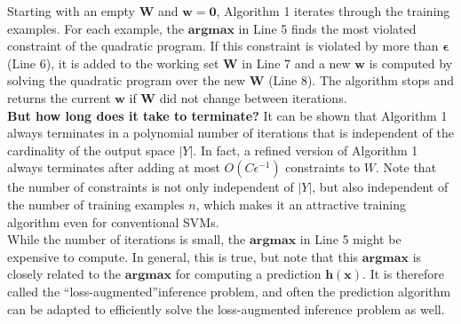 \documentclass[twoside]{article}
\begin{document}
Starting
with an empty $\mathbf{W}$ and $\mathbf{w=0}$, Algorithm 1 iterates through
the training examples. For each example, the $\mathbf{argmax}$ in Line 5 finds the most violated constraint of the quadratic
program. If this constraint is violated by more than $\mathbf{\epsilon}$ (Line 6), it is added to the working set $\mathbf{W}$ in Line 7 and a
new $\mathbf{w}$ is computed by solving the quadratic program over
the new $\mathbf{W}$ (Line 8). The algorithm stops and returns the
current $\mathbf{w}$ if $\mathbf{W}$ did not change between iterations.\\ 

\textbf{But how long does
it take to terminate?} It can be shown that Algorithm 1
always terminates in a polynomial number of iterations that is independent of the cardinality of the output space $|Y|$. In
fact, a refined version of Algorithm 1  always terminates after adding at most $O(C\epsilon^{-1})$ constraints to $W$. Note that the number of constraints
is not only independent of $|Y|$, but also independent of the
number of training examples $n$, which makes it an attractive
training algorithm even for conventional SVMs. \\
While the number of iterations is small, the $\mathbf{argmax}$ in
Line 5 might be expensive to compute. In general, this is
true, but note that this $\mathbf{argmax}$ is closely related to the
$\mathbf{argmax}$ for computing a prediction $\mathbf{h(x)}$. It is therefore
called the “loss-augmented”inference problem, and often the
prediction algorithm can be adapted to efficiently solve the
loss-augmented inference problem as well.
\end{document}
